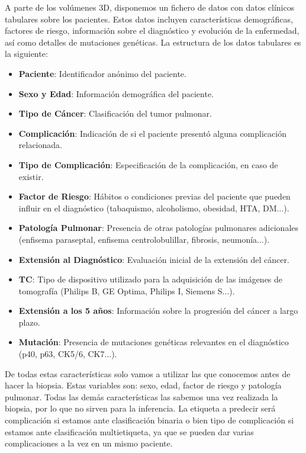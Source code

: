 A parte de los volúmenes 3D, disponemos un fichero de datos con datos clínicos tabulares sobre los pacientes. Estos datos incluyen características demográficas, factores de riesgo, información sobre el diagnóstico y evolución de la enfermedad, así como detalles de mutaciones genéticas. La estructura de los datos tabulares es la siguiente: 
\begin{itemize}
    \item \textbf{Paciente}: Identificador anónimo del paciente.
    \item \textbf{Sexo y Edad}: Información demográfica del paciente.
    \item \textbf{Tipo de Cáncer}: Clasificación del tumor pulmonar.
    \item \textbf{Complicación}: Indicación de si el paciente presentó alguna complicación relacionada.
    \item \textbf{Tipo de Complicación}: Especificación de la complicación, en caso de existir.
    \item \textbf{Factor de Riesgo}: Hábitos o condiciones previas del paciente que pueden influir en el diagnóstico (tabaquismo, alcoholismo, obesidad, HTA, DM...).
    \item \textbf{Patología Pulmonar}: Presencia de otras patologías pulmonares adicionales (enfisema paraseptal, enfisema centrolobulillar, fibrosis, neumonía...).
    \item \textbf{Extensión al Diagnóstico}: Evaluación inicial de la extensión del cáncer.
    \item \textbf{TC}: Tipo de dispositivo utilizado para la adquisición de las imágenes de tomografía (Philips B, GE Optima, Philips I, Siemens S...). 
    \item \textbf{Extensión a los 5 años}: Información sobre la progresión del cáncer a largo plazo.
    \item \textbf{Mutación}: Presencia de mutaciones genéticas relevantes en el diagnóstico (p40, p63, CK5/6, CK7...).
\end{itemize}

De todas estas características solo vamos a utilizar las que conocemos antes de hacer la biopsia. Estas variables son: sexo, edad, factor de riesgo y patología pulmonar. Todas las demás características las sabemos una vez realizada la biopsia, por lo que no sirven para la inferencia. La etiqueta a predecir será complicación si estamos ante clasificación binaria o bien tipo de complicación si estamos ante clasificación multietiqueta, ya que se pueden dar varias complicaciones a la vez en un mismo paciente. 

